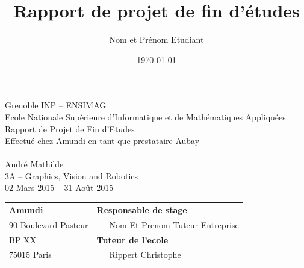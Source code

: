 \documentclass[12pt,a4paper,twoside]{report}
\title{Rapport de projet de fin d'\'etudes}
\author{Nom et Prénom Etudiant}
\date{\today}
\begin{document}
\thispagestyle{empty}

\begin{center}
\makebox[\textwidth][l]{
\raisebox{-8pt}[0pt][0pt]{
}
}
Grenoble INP  -- ENSIMAG\\
Ecole Nationale Sup\`erieure d'Informatique et de Math\'ematiques Appliqu\'ees\\
\vspace{3cm}
{\LARGE Rapport de Projet de Fin d'Etudes }\\
\vspace{1cm}
Effectu\'e chez Amundi en tant que prestataire Aubay\\
\vspace{2cm}
\\
\vspace{3cm}
Andr\'e Mathilde\\
3A -- Graphics, Vision and Robotics\\
\vspace{3mm}
02 Mars 2015 -- 31 Ao\^ut 2015\\
\vspace{3,5cm}
\begin{tabular}{p{10cm}p{10cm}}
{\bf Amundi}                                            &{\bf Responsable de stage}\\
{\footnotesize 90 Boulevard Pasteur}       & ~~~Nom Et Prenom Tuteur Entreprise\\
{\footnotesize BP XX}                                        & {\bf Tuteur de l'ecole}\\
{\footnotesize 75015 Paris}                          & ~~~Rippert Christophe\\
\end{tabular}
\end{center}
\newpage
\renewcommand{\contentsname}{Table des mati\`eres} %
\tableofcontents
\end{document}
